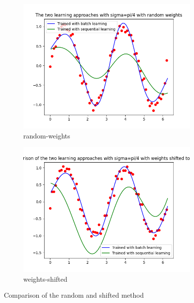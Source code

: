 \documentclass[a4paper]{article}
\begin{document}
\begin{figure}[htb]
    \centering
    \begin{subfigure}{0.4\textwidth}
        \centering
        \includegraphics[width=\textwidth]{Labs/Lab 2/Steinar/results/comparison-random-weights.png}
        \caption{random-weights}
    \end{subfigure}
    \hfill
    \begin{subfigure}{0.4\textwidth}
        \centering
        \includegraphics[width=\textwidth]{Labs/Lab 2/Steinar/results/comparison-weights-shifted.png}
        \caption{weights-shifted}
    \end{subfigure}
    \hfill
    \caption{Comparison of the random and shifted method}
    \label{fig:Random weights}
\end{figure}
\end{document}
